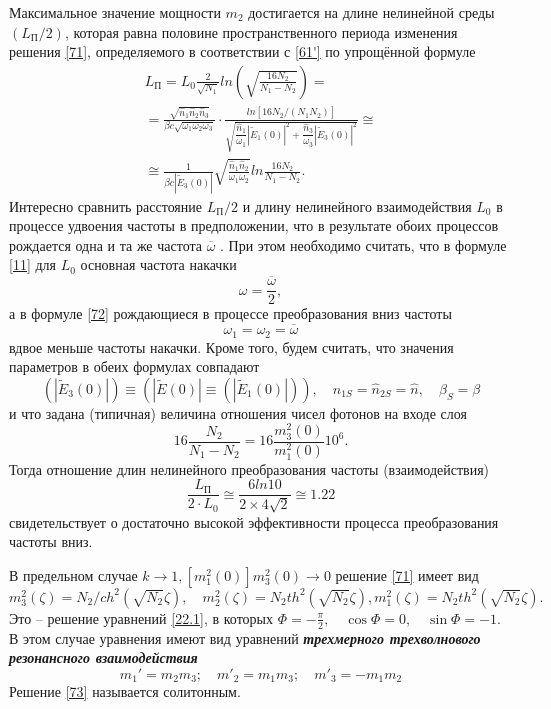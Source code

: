 \documentclass[a4paper]{article}
\begin{document}
	Максимальное значение мощности $m_{2}$ достигается на длине нелинейной среды $(L_{\text{П}}/2)$, которая равна половине пространственного периода изменения решения \eqref{71}, определяемого в соответствии с \eqref{61'} по упрощённой формуле 
	\begin{multline}
		L_{\text{П}}=L_{0}\frac{2}{\sqrt{N_{1}}}ln\left(\sqrt{\frac{16N_{2}}{N_{1}-N_{2}}}\right)=\\
		=\frac{\sqrt{\hat{n}_{1}\hat{n}_{2}\hat{n}_{3}}}{\beta c\sqrt{\omega_{1}\omega_{2}\omega_{3}}}\cdot\frac{ln[16N_{2}/(N_{1}N_{2})]}{\sqrt{\dfrac{\hat{n}_{1}}{\omega_{1}}|\tilde{E}_{1}(0)|^{2}+\dfrac{\hat{n}_{3}}{\omega_{3}}|\tilde{E}_{3}(0)|^{2}}}\cong\\
		\cong\frac{1}{\beta c|\tilde{E}_{3}(0)|}\sqrt{\frac{\hat{n}_{1}\hat{n}_{2}}{\omega_{1}\omega_{2}}}ln\frac{16N_{2}}{N_{1}-N_{2}}.
		\label{72}
	\end{multline}
	Интересно сравнить расстояние $L_{\text{П}}/2$ и длину нелинейного взаимодействия $L_{0}$ в процессе удвоения частоты в предположении, что в результате обоих процессов рождается одна и та же частота $\overline{\omega}$ . При этом необходимо считать, что в формуле \eqref{11} для $L_{0}$ основная частота накачки $$\omega=\frac{\overline{\omega}}{2},$$	
	а в формуле \eqref{72} рождающиеся в процессе преобразования вниз частоты $$\omega_{1}=\omega_{2}=\overline{\omega}$$ вдвое меньше частоты накачки. Кроме того, будем считать, что значения параметров в обеих формулах совпадают $$(|\tilde{E}_{3}(0)|)\equiv(|\tilde{E}(0)|\equiv(|\tilde{E}_{1}(0)|)),\quad \hat{n}_{1S}=\hat{n}_{2S}=\hat{n},\quad\beta_{S}=\beta$$ и что задана (типичная) величина отношения чисел фотонов на входе слоя $$16\frac{N_{2}}{N_{1}-N_{2}}=16\frac{m_{3}^{2}(0)}{m_{1}^{2}(0)}10^{6}.$$ Тогда отношение длин нелинейного преобразования частоты (взаимодействия) $$\frac{L_\text{П}}{2\cdot L_{0}}\cong\frac{6ln10}{2\times4\sqrt{2}}\cong1.22$$ свидетельствует о достаточно высокой эффективности процесса преобразования частоты вниз.
	
	В предельном случае $k\rightarrow1,[m_{1}^{2}(0)]m_{3}^{2}(0)\rightarrow0$ решение \eqref{71} имеет вид 
	\begin{equation}
		m_{3}^{2}(\zeta)=N_{2}/ch^{2}(\sqrt{N_{2}}\zeta),\quad m_{2}^{2}(\zeta)=N_{2}th^{2}(\sqrt{N_{2}}\zeta), m_{1}^{2}(\zeta)=N_{2}th^{2}(\sqrt{N_{2}}\zeta).\label{73} 
	\end{equation}
	Это – решение уравнений \eqref{22.1}, в которых $\Phi=-\frac{\pi}{2},\quad \cos\Phi=0, \quad\sin\Phi=-1.$  В этом случае уравнения имеют вид уравнений \textbf{\textit{трехмерного трехволнового резонансного взаимодействия}}
	\begin{equation}
		m_{1}'=m_{2}m_{3};\quad m'_{2}=m_{1}m_{3};\quad m'_{3}=-m_{1}m_{2}		
		\label{74}
	\end{equation}
	Решение \eqref{73} называется солитонным. 
	
\end{document}
